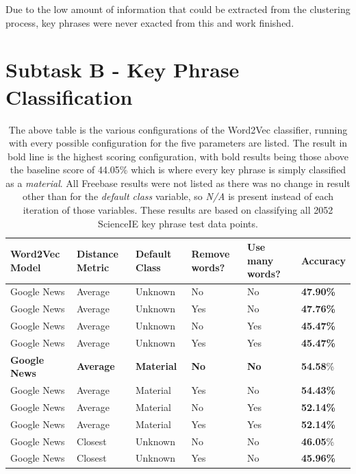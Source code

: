 Due to the low amount of information that could be extracted from the clustering process, key phrases were never exacted from this and work finished.

\section{Subtask B - Key Phrase Classification}

\begin{table}
	\centering
	\caption[Word2Vec Classification Results]{The above table is the various configurations of the Word2Vec classifier, running with every possible configuration for the five parameters are listed. The result in bold line is the highest scoring configuration, with bold results being those above the baseline score of 44.05\% which is where every key phrase is simply classified as a \textit{material}. All Freebase results were not listed as there was no change in result other than for the \textit{default class} variable, so \textit{N/A} is present instead of each iteration of those variables. These results are based on classifying all 2052 ScienceIE key phrase test data points.}
	\begin{tabular}{ C{2.5cm} | C{2cm} | C{2cm} | C{2cm} | C{2cm} | C{2cm} }
		\textbf{Word2Vec Model} & \textbf{Distance Metric} & \textbf{Default Class} & \textbf{Remove words?} & \textbf{Use many words?} & \textbf{Accuracy} \\
		\hline
		Google News & Average & Unknown & No & No & \textbf{47.90\%} \\
		Google News & Average & Unknown & Yes & No & \textbf{47.76\%} \\
		Google News & Average & Unknown & No & Yes & \textbf{45.47\%} \\
		Google News & Average & Unknown & Yes & Yes & \textbf{45.47\%} \\
		\textbf{Google News} & \textbf{Average} & \textbf{Material} & \textbf{No} & \textbf{No} & \textbf{54.58}\% \\
		Google News & Average & Material & Yes & No & \textbf{54.43\%} \\
		Google News & Average & Material & No & Yes & \textbf{52.14\%} \\
		Google News & Average & Material & Yes & Yes  & \textbf{52.14\%} \\
		Google News & Closest & Unknown & No & No & \textbf{46.05}\% \\
		Google News & Closest & Unknown & Yes & No & \textbf{45.96\%} \\

\end{tabular}
\end{table}
